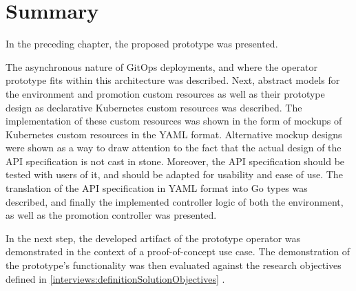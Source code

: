 \section{Summary}

In the preceding chapter,
the proposed prototype was presented.

The asynchronous nature of GitOps deployments, and where
the operator prototype fits within this architecture was described.
Next, abstract models for the environment and promotion custom resources as well as their prototype
design as declarative Kubernetes custom resources was described.
The implementation of these custom resources was shown in the form of mockups
of Kubernetes custom resources in the YAML format.
Alternative mockup designs were shown as a way to draw attention to the fact
that the actual design of the API specification is not cast in stone.
Moreover, the API specification should be tested with users of it,
and should be adapted for usability and ease of use.
The translation of the API specification in YAML format into Go types was described,
and finally the implemented controller logic of both the environment, as well as
the promotion controller was presented.

In the next step, the developed artifact of the prototype operator was
demonstrated in the context of a proof-of-concept use case.
The demonstration of the prototype's functionality was then evaluated against
the research objectives defined in
\ref{interviews:definitionSolutionObjectives} .














